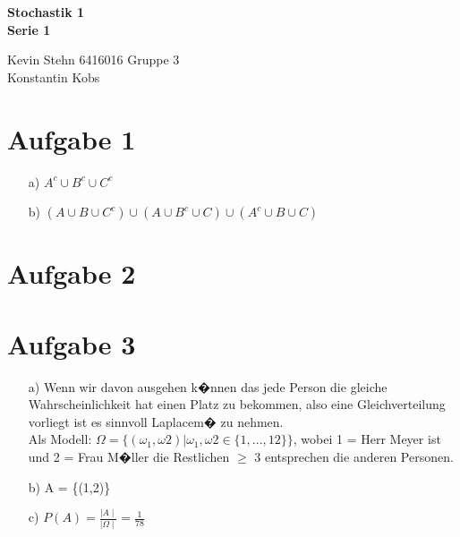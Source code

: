 \documentclass[10pt,a4paper]{article}
\begin{document}
\begin{center}
\textbf{Stochastik 1 \\ Serie 1 \\}
\end{center}

\begin{flushright}
Kevin Stehn 6416016 Gruppe 3 \\
Konstantin Kobs
\end{flushright}

\section*{Aufgabe 1}
\begin{itemize}
\item[a)] $A^{c} \cup B^{c} \cup C^{c}$

\item[b)] 
$(A \cup B \cup C^{c}) \cup (A \cup B^{c} \cup C) \cup (A^{c} \cup B \cup C) $
\end{itemize}

\section*{Aufgabe 2}

\section*{Aufgabe 3}

\begin{itemize}
\item[a)] Wenn wir davon ausgehen k�nnen das jede Person die gleiche Wahrscheinlichkeit hat einen Platz zu bekommen, also eine Gleichverteilung vorliegt ist es sinnvoll Laplacem� zu nehmen.\\
Als Modell: $ \Omega = \{(\omega_{1},\omega{2}) | \omega_{1},\omega{2} \in\{1,...,12\} \} $, wobei 1 = Herr Meyer ist und 2 = Frau M�ller die Restlichen $\geq$ 3 entsprechen die anderen Personen. 

\item[b)]
A = \{(1,2)\}

\item[c)]
$P(A) = \frac{\mid A \mid}{\mid \Omega \mid} = \frac{1}{78}$ %
\end{itemize}
\end{document}
